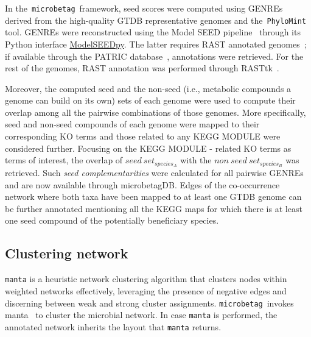 \documentclass[sn-mathphys,Numbered]{sn-jnl}  %
\theoremstyle{thmstyleone}%
\theoremstyle{thmstyletwo}%
\theoremstyle{thmstylethree}%
\newcommand{\microbetag}{\texttt{microbetag}}
\begin{document}
        In the~\microbetag~framework, seed scores were computed using GENREs derived from the high-quality GTDB representative genomes and the~\texttt{PhyloMint} tool.
        GENREs were reconstructed using the Model SEED pipeline~\cite{henry2010high} through its Python interface \href{https://modelseedpy.readthedocs.io/en/latest/index.html}{ModelSEEDpy}.
        The latter requires RAST annotated genomes~\cite{overbeek2014seed}; 
        if available through the PATRIC database~\cite{wattam2017improvements}, annotations were retrieved.
        For the rest of the genomes, RAST annotation was performed through RASTtk~\cite{brettin2015rasttk}.

        Moreover, the computed seed and the non-seed (i.e., metabolic compounds a genome can build on its own) sets of each genome were used to compute their overlap among all the pairwise combinations of those genomes.
        More specifically, seed and non-seed compounds of each genome were mapped to their corresponding KO terms and those related to any KEGG MODULE were considered further.
        Focusing on the KEGG MODULE - related KO terms as terms of interest, the overlap of ${seed\ set}_{species_A}$ with the ${non\ seed\ set}_{species_B}$ was retrieved.
        Such \textit{seed complementarities} were calculated for all pairwise GENREs and are now available through microbetagDB.
        Edges of the co-occurrence network where both taxa have been mapped to at least one GTDB genome can be further annotated mentioning all the KEGG maps for which there is at least one seed compound of the potentially beneficiary species. 



    \subsection*{Clustering network}
    \label{subsec:manta}

        \texttt{manta} is a heuristic network clustering algorithm that clusters nodes within weighted networks effectively, leveraging the presence of negative edges and discerning between weak and strong cluster assignments.
        \microbetag~invokes manta~\cite{rottjers2020manta} to cluster the microbial network.
        In case \texttt{manta} is performed, the annotated network inherits the layout that \texttt{manta} returns.
\end{document}

